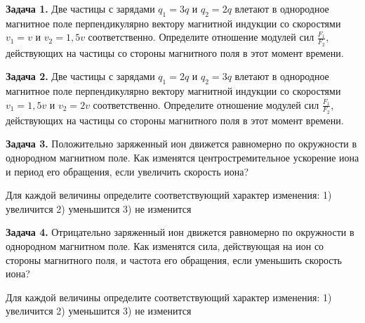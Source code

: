 
\begin{taskbasic}[code={\label{task:elem_mag_v1_n12}}]
\textbf{Задача 1.} Две частицы с зарядами $q_1 = 3q$ и $q_2 = 2q$ влетают в однородное магнитное поле перпендикулярно вектору магнитной индукции со скоростями $v_1 = v$ и $v_2 = 1{,}5v$ соответственно. Определите отношение модулей сил $\frac{F_1}{F_2}$, действующих на частицы со стороны магнитного поля в этот момент времени.

\end{taskbasic}

\begin{taskbasic}[code={\label{task:elem_mag_v2_n12}}]
\textbf{Задача 2.} Две частицы с зарядами $q_1 = 2q$ и $q_2 = 3q$ влетают в однородное магнитное поле перпендикулярно вектору магнитной индукции со скоростями $v_1 = 1{,}5v$ и $v_2 = 2v$ соответственно. Определите отношение модулей сил $\frac{F_1}{F_2}$, действующих на частицы со стороны магнитного поля в этот момент времени.

\end{taskbasic}

\begin{taskbasic}[code={\label{task:elem_mag_v3_n15}}]
\textbf{Задача 3.} Положительно заряженный ион движется равномерно по окружности в однородном магнитном поле. Как изменятся центростремительное ускорение иона и период его обращения, если увеличить скорость иона?

Для каждой величины определите соответствующий характер изменения:
1) увеличится
2) уменьшится
3) не изменится

\end{taskbasic}

\begin{taskbasic}[code={\label{task:elem_mag_v4_n15}}]
\textbf{Задача 4.} Отрицательно заряженный ион движется равномерно по окружности в однородном магнитном поле. Как изменятся сила, действующая на ион со стороны магнитного поля, и частота его обращения, если уменьшить скорость иона?

Для каждой величины определите соответствующий характер изменения:
1) увеличится
2) уменьшится
3) не изменится

\end{taskbasic}

